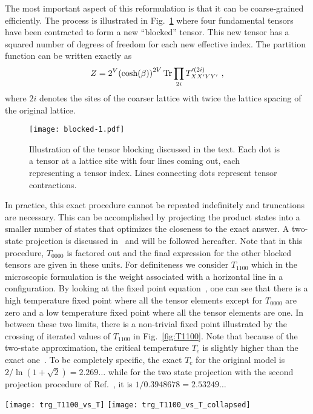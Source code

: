 \documentclass[../main.tex]{subfiles}
\begin{document}
The most important aspect of this reformulation is that it can be
coarse-grained efficiently.  The process is illustrated in
Fig.~\ref{fig:unit_block} where four fundamental tensors have been contracted
to form a new ``blocked'' tensor.  This new tensor has a squared number of
degrees of freedom for each new effective index. The partition function can be
written exactly as 
%
\begin{equation*}
  Z= 2^V{(\cosh (\beta))}^{2V}\operatorname{Tr}\prod_{2i}T'^{(2i)}_{XX'YY'} \ , 
\label{eq:ZP}
\end{equation*}
%
where $2i$ denotes the sites of the coarser lattice with twice the lattice
spacing of the original lattice. 
%
\begin{figure}[htpb]
    \centering
    \texttt{[image: blocked-1.pdf]}
    \caption{Illustration of the tensor blocking discussed in the text.  Each
      dot is a tensor at a lattice site with four lines coming out, each
      representing a tensor index.  Lines connecting dots represent tensor
    contractions.}%
\label{fig:unit_block}
\end{figure}
%
In practice, this exact procedure cannot be repeated indefinitely and
truncations are necessary. This can be accomplished by projecting the product
states into a smaller number of states that optimizes the closeness to the
exact answer.  A two-state projection is discussed in~\cite{prb87} and will be
followed hereafter. Note that in this procedure, $T_{0000}$ is factored out and
the final expression for the other blocked tensors are given in these units.
For definiteness we consider $T_{1100}$ which in the microscopic formulation is
the weight associated with a horizontal line in a \lc  configuration. By
looking at the fixed point equation~\cite{prb87}, one can see that there is a
high temperature fixed point where all the tensor elements except for
$T_{0000}$ are zero and a low temperature fixed point where all the tensor
elements are one. In between these two limits, there is a non-trivial fixed
point illustrated by the crossing of iterated values of $T_{1100}$ in
Fig.~\ref{fig:T1100}. Note that because of the two-state approximation, the
critical temperature $T_c$ is slightly higher than the exact one~\cite{prb87}.
To be completely specific, the exact $T_c$ for the original model is
$2/\ln(1+\sqrt{2})=2.269\ldots$ while for the two state projection with the
second projection procedure of Ref.~\cite{prb87}, it is $1/0.3948678
=2.53249\ldots$
%
\begin{figure*}[htpb]
    \centering 
     \texttt{[image: trg\_T1100\_vs\_T]}
     \texttt{[image: trg\_T1100\_vs\_T\_collapsed]}
     \caption{(a) $T_{1100}$ vs. $T - T_c^{(2s)}$ for six successive iterations of the blocking transformation,
     beginning with an initial lattice $L = 64$; (b) $T_{1100}$ vs. $(T - T_{c}^{(2s)}) / L_{eff}$ illustrating the
     data collapse, where $T_{c}^{(2s)}$ is the critical temperature of the two state projection, beginning at
     iteration 0 on an $L = 64$ lattice.}%
\label{fig:T1100}
\end{figure*}
\end{document}
